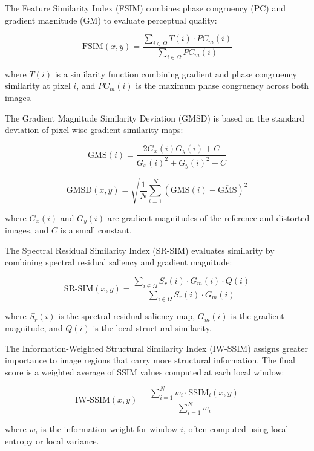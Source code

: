 The Feature Similarity Index (FSIM) combines phase congruency (PC) and gradient magnitude (GM) to evaluate perceptual quality:

\begin{equation}
\text{FSIM}(x, y) = \frac{\sum_{i \in \Omega} T(i) \cdot PC_m(i)}{\sum_{i \in \Omega} PC_m(i)}
\end{equation}

where $T(i)$ is a similarity function combining gradient and phase congruency similarity at pixel $i$, and $PC_m(i)$ is the maximum phase congruency across both images.

The Gradient Magnitude Similarity Deviation (GMSD) is based on the standard deviation of pixel-wise gradient similarity maps:

\begin{equation}
\text{GMS}(i) = \frac{2G_x(i) G_y(i) + C}{{G_x(i)}^2 + {G_y(i)}^2 + C}
\end{equation}

\begin{equation}
\text{GMSD}(x, y) = \sqrt{\frac{1}{N} \sum_{i=1}^{N} {\left( \text{GMS}(i) - \overline{\text{GMS}} \right)}^2}
\end{equation}

where $G_x(i)$ and $G_y(i)$ are gradient magnitudes of the reference and distorted images, and $C$ is a small constant.

The Spectral Residual Similarity Index (SR-SIM) evaluates similarity by combining spectral residual saliency and gradient magnitude:

\begin{equation}
\text{SR-SIM}(x, y) = \frac{\sum_{i \in \Omega} S_r(i) \cdot G_m(i) \cdot Q(i)}{\sum_{i \in \Omega} S_r(i) \cdot G_m(i)}
\end{equation}

where $S_r(i)$ is the spectral residual saliency map, $G_m(i)$ is the gradient magnitude, and $Q(i)$ is the local structural similarity.

The Information-Weighted Structural Similarity Index (IW-SSIM) assigns greater importance to image regions that carry more structural information. The final score is a weighted average of SSIM values computed at each local window:

\begin{equation}
\text{IW-SSIM}(x, y) = \frac{\sum_{i=1}^{N} w_i \cdot \text{SSIM}_i(x, y)}{\sum_{i=1}^{N} w_i}
\end{equation}

where $w_i$ is the information weight for window $i$, often computed using local entropy or local variance.

